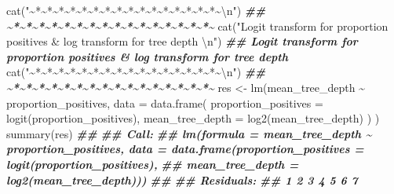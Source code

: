 \documentclass[
  11pt,
  oneside]{book}
\newenvironment{Shaded}{\begin{snugshade}}{\end{snugshade}}
\newcommand{\AttributeTok}[1]{\textcolor[rgb]{0.77,0.63,0.00}{#1}}
\newcommand{\DocumentationTok}[1]{\textcolor[rgb]{0.56,0.35,0.01}{\textbf{\textit{#1}}}}
\newcommand{\FunctionTok}[1]{\textcolor[rgb]{0.00,0.00,0.00}{#1}}
\newcommand{\NormalTok}[1]{#1}
\newcommand{\OtherTok}[1]{\textcolor[rgb]{0.56,0.35,0.01}{#1}}
\newcommand{\SpecialCharTok}[1]{\textcolor[rgb]{0.00,0.00,0.00}{#1}}
\newcommand{\StringTok}[1]{\textcolor[rgb]{0.31,0.60,0.02}{#1}}
\begin{document}
\begin{Shaded}
\begin{Highlighting}[]
\FunctionTok{cat}\NormalTok{(}\StringTok{"\textasciitilde{}*\textasciitilde{}*\textasciitilde{}*\textasciitilde{}*\textasciitilde{}*\textasciitilde{}*\textasciitilde{}*\textasciitilde{}*\textasciitilde{}*\textasciitilde{}*\textasciitilde{}*\textasciitilde{}*\textasciitilde{}*\textasciitilde{}*\textasciitilde{}*\textasciitilde{}*\textasciitilde{}}\SpecialCharTok{\textbackslash{}n}\StringTok{"}\NormalTok{)}
\DocumentationTok{\#\# \textasciitilde{}*\textasciitilde{}*\textasciitilde{}*\textasciitilde{}*\textasciitilde{}*\textasciitilde{}*\textasciitilde{}*\textasciitilde{}*\textasciitilde{}*\textasciitilde{}*\textasciitilde{}*\textasciitilde{}*\textasciitilde{}*\textasciitilde{}*\textasciitilde{}*\textasciitilde{}*\textasciitilde{}}
\FunctionTok{cat}\NormalTok{(}\StringTok{"Logit transform for proportion positives \& log transform for tree depth }\SpecialCharTok{\textbackslash{}n}\StringTok{"}\NormalTok{)}
\DocumentationTok{\#\# Logit transform for proportion positives \& log transform for tree depth}
\FunctionTok{cat}\NormalTok{(}\StringTok{"\textasciitilde{}*\textasciitilde{}*\textasciitilde{}*\textasciitilde{}*\textasciitilde{}*\textasciitilde{}*\textasciitilde{}*\textasciitilde{}*\textasciitilde{}*\textasciitilde{}*\textasciitilde{}*\textasciitilde{}*\textasciitilde{}*\textasciitilde{}*\textasciitilde{}*\textasciitilde{}*\textasciitilde{}}\SpecialCharTok{\textbackslash{}n}\StringTok{"}\NormalTok{)}
\DocumentationTok{\#\# \textasciitilde{}*\textasciitilde{}*\textasciitilde{}*\textasciitilde{}*\textasciitilde{}*\textasciitilde{}*\textasciitilde{}*\textasciitilde{}*\textasciitilde{}*\textasciitilde{}*\textasciitilde{}*\textasciitilde{}*\textasciitilde{}*\textasciitilde{}*\textasciitilde{}*\textasciitilde{}*\textasciitilde{}}
\NormalTok{res }\OtherTok{\textless{}{-}} \FunctionTok{lm}\NormalTok{(mean\_tree\_depth }\SpecialCharTok{\textasciitilde{}}\NormalTok{ proportion\_positives,}
  \AttributeTok{data =} \FunctionTok{data.frame}\NormalTok{(}
    \AttributeTok{proportion\_positives =} \FunctionTok{logit}\NormalTok{(proportion\_positives),}
    \AttributeTok{mean\_tree\_depth =} \FunctionTok{log2}\NormalTok{(mean\_tree\_depth)}
\NormalTok{  )}
\NormalTok{)}
\FunctionTok{summary}\NormalTok{(res)}
\DocumentationTok{\#\# }
\DocumentationTok{\#\# Call:}
\DocumentationTok{\#\# lm(formula = mean\_tree\_depth \textasciitilde{} proportion\_positives, data = data.frame(proportion\_positives = logit(proportion\_positives), }
\DocumentationTok{\#\#     mean\_tree\_depth = log2(mean\_tree\_depth)))}
\DocumentationTok{\#\# }
\DocumentationTok{\#\# Residuals:}
\DocumentationTok{\#\#        1        2        3        4        5        6        7 }

\end{Highlighting}
\end{Shaded}
\end{document}
